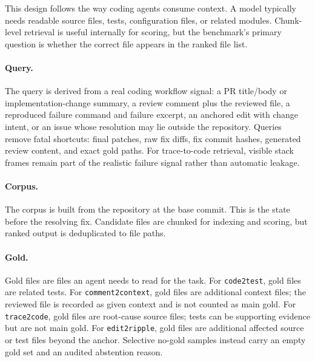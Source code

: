 \documentclass[11pt]{article}
\newcommand{\code}[1]{\texttt{#1}}
\begin{document}
This design follows the way coding agents consume context. A model typically needs readable source files, tests, configuration files, or related modules. Chunk-level retrieval is useful internally for scoring, but the benchmark's primary question is whether the correct file appears in the ranked file list.

\paragraph{Query.}
The query is derived from a real coding workflow signal: a PR title/body or implementation-change summary, a review comment plus the reviewed file, a reproduced failure command and failure excerpt, an anchored edit with change intent, or an issue whose resolution may lie outside the repository. Queries remove fatal shortcuts: final patches, raw fix diffs, fix commit hashes, generated review content, and exact gold paths. For trace-to-code retrieval, visible stack frames remain part of the realistic failure signal rather than automatic leakage.

\paragraph{Corpus.}
The corpus is built from the repository at the base commit. This is the state before the resolving fix. Candidate files are chunked for indexing and scoring, but ranked output is deduplicated to file paths.

\paragraph{Gold.}
Gold files are files an agent needs to read for the task. For \code{code2test}, gold files are related tests. For \code{comment2context}, gold files are additional context files; the reviewed file is recorded as given context and is not counted as main gold. For \code{trace2code}, gold files are root-cause source files; tests can be supporting evidence but are not main gold. For \code{edit2ripple}, gold files are additional affected source or test files beyond the anchor. Selective no-gold samples instead carry an empty gold set and an audited abstention reason.
\end{document}
